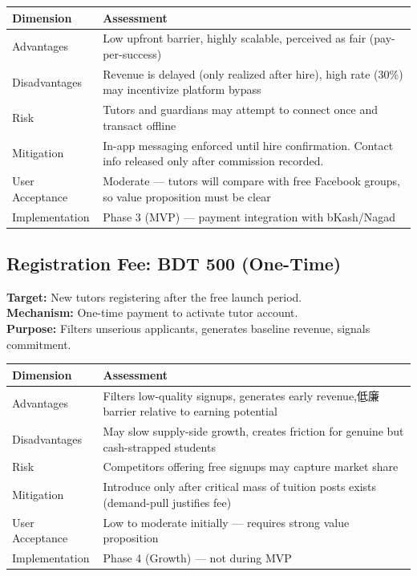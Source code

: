 \documentclass[12pt,a4paper,twoside]{report}
\begin{document}
\begin{longtable}{p{4cm}|p{9cm}}
\toprule
\textbf{Dimension} & \textbf{Assessment} \\
\midrule
\endhead
\bottomrule
\endfoot
Advantages       & Low upfront barrier, highly scalable, perceived as fair (pay-per-success) \\
Disadvantages    & Revenue is delayed (only realized after hire), high rate (30\%) may incentivize platform bypass \\
Risk             & Tutors and guardians may attempt to connect once and transact offline \\
Mitigation       & In-app messaging enforced until hire confirmation. Contact info released only after commission recorded. \\
User Acceptance  & Moderate — tutors will compare with free Facebook groups, so value proposition must be clear \\
Implementation   & Phase 3 (MVP) — payment integration with bKash/Nagad \\
\bottomrule
\end{longtable}

\subsection{Registration Fee: BDT 500 (One-Time)}

\textbf{Target:} New tutors registering after the free launch period. \\
\textbf{Mechanism:} One-time payment to activate tutor account. \\
\textbf{Purpose:} Filters unserious applicants, generates baseline revenue, signals commitment.

\begin{longtable}{p{4cm}|p{9cm}}
\toprule
\textbf{Dimension} & \textbf{Assessment} \\
\midrule
\endhead
\bottomrule
\endfoot
Advantages       & Filters low-quality signups, generates early revenue,低廉 barrier relative to earning potential \\
Disadvantages    & May slow supply-side growth, creates friction for genuine but cash-strapped students \\
Risk             & Competitors offering free signups may capture market share \\
Mitigation       & Introduce only after critical mass of tuition posts exists (demand-pull justifies fee) \\
User Acceptance  & Low to moderate initially — requires strong value proposition \\
Implementation   & Phase 4 (Growth) — not during MVP \\
\bottomrule
\end{longtable}
\end{document}
